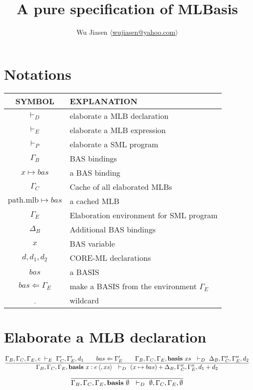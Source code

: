 \documentclass[11pt,a4paper]{article}
\newcommand{\keyword}[1]{\textrm{\textbf{#1}}}
\newcommand{\basis}[1]{\keyword{basis}\ #1\ }
\newcommand{\pathmlb}{\textrm{path.mlb}}
\newcommand{\makebasis}[2]{ #1 \Leftarrow #2 }
\newcommand{\Binds}{\Gamma_B}
\newcommand{\BndAD}{\Delta_B}
\newcommand{\Cache}{\Gamma_C}
\newcommand{\Elabo}{\Gamma_E}
\newcommand{\Empty}{\emptyset}
\newcommand{\optional}[1]{\langle #1 \rangle}
\newcommand{\ElabDec}{\ \vdash_D\ }
\newcommand{\ElabExp}{\ \vdash_E\ }
\newcommand{\ElabProg}{\ \vdash_P\ }
\newcommand{\wildcard}{\underline{\phantom{2}}}
\begin{document}
\title {A pure specification of MLBasis}
\author{Wu Jiasen $\langle$\href{mailto:wujiasen@yahoo.com}{wujiasen@yahoo.com}$\rangle$}
\maketitle 
\thispagestyle{fancy}

\section{Notations}
\begin{center}
\begin{tabular}{|c|l|}
\hline
SYMBOL      & EXPLANATION   \\
\hline
$\ElabDec$  & elaborate a MLB declaration \\
\hline
$\ElabExp$  & elaborate a MLB expression  \\
\hline
$\ElabProg$ & elaborate a SML program \\
\hline
$\Binds$    & BAS bindings  \\
\hline
$x \mapsto bas$ & a BAS binding \\
\hline
$\Cache$    & Cache of all elaborated MLBs \\
\hline
$\pathmlb \mapsto bas$ & a cached MLB \\
\hline
$\Elabo$    & Elaboration environment for SML program \\
\hline
$\BndAD$    & Additional BAS bindings  \\
\hline
$x$         & BAS variable  \\
\hline      
$d,d_1,d_2$ & CORE-ML declarations \\      
\hline
$ bas $     & a BASIS \\
\hline
$ \makebasis{bas}{\Elabo}$ & make a BASIS from the environment $\Elabo$ \\
\hline
$\wildcard$   & wildcard \\
\hline
\end{tabular}
\end{center}

\section{Elaborate a MLB declaration}
\[
\dfrac{ \Binds,\Cache,\Elabo,e \ElabExp \Cache',\Elabo',d_1 \qquad 
        \makebasis{bas}{\Elabo'} \qquad 
        \Binds,\Cache,\Elabo, \basis{xs} \ElabDec \BndAD, \Cache'', \Elabo'', d_2 }
      { \Binds,\Cache,\Elabo, \basis{x:e\,\optional{,xs}} \ElabDec (x \mapsto bas) + \BndAD, \Cache'', \Elabo'', d_1 + d_2 }
\]
\[
\dfrac{ }
      { \Binds,\Cache,\Elabo, \basis{\Empty} \ElabDec \Empty, \Cache, \Elabo, \Empty}
\]
\end{document}
